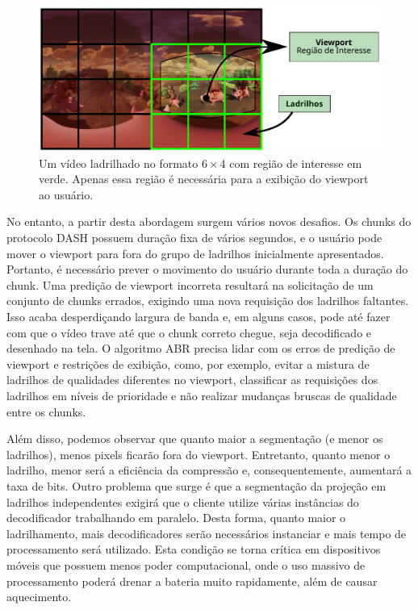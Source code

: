 \begin{figure}[h]
	\centering
	\includegraphics[width=0.80\columnwidth]{fig/viewport2.pdf}
	\caption{Um vídeo ladrilhado no formato $6 \times 4$ com região de interesse em verde. Apenas essa região é necessária para a exibição do viewport ao usuário.}
	\label{fig:viewport2}
\end{figure}

No entanto, a partir desta abordagem surgem vários novos desafios. Os chunks do protocolo DASH possuem duração fixa de vários segundos, e o usuário pode mover o viewport para fora do grupo de ladrilhos inicialmente apresentados. Portanto, é necessário prever o movimento do usuário durante toda a duração do chunk. Uma predição de viewport incorreta resultará na solicitação de um conjunto de chunks errados, exigindo uma nova requisição dos ladrilhos faltantes. Isso acaba desperdiçando largura de banda e, em alguns casos, pode até fazer com que o vídeo trave até que o chunk correto chegue, seja decodificado e desenhado na tela. O algoritmo ABR precisa lidar com os erros de predição de viewport e restrições de exibição, como, por exemplo, evitar a mistura de ladrilhos de qualidades diferentes no viewport, classificar as requisições dos ladrilhos em níveis de prioridade e não realizar mudanças bruscas de qualidade entre os chunks.

Além disso, podemos observar que quanto maior a segmentação (e menor os ladrilhos), menos pixels ficarão fora do viewport. Entretanto, quanto menor o ladrilho, menor será a eficiência da compressão e, consequentemente, aumentará a taxa de bits. Outro problema que surge é que a segmentação da projeção em ladrilhos independentes exigirá que o cliente utilize várias instâncias do decodificador trabalhando em paralelo. Desta forma, quanto maior o ladrilhamento, mais decodificadores serão necessários instanciar e mais tempo de processamento será utilizado. Esta condição se torna crítica em dispositivos móveis que possuem menos poder computacional, onde o uso massivo de processamento poderá drenar a bateria muito rapidamente, além de causar aquecimento.

